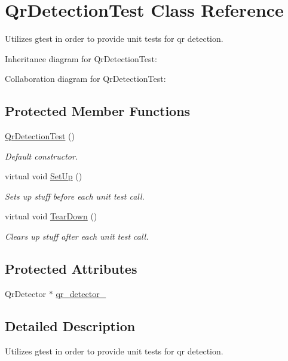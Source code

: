 \hypertarget{classQrDetectionTest}{\section{Qr\-Detection\-Test Class Reference}
\label{classQrDetectionTest}
}


Utilizes gtest in order to provide unit tests for qr detection.  




Inheritance diagram for Qr\-Detection\-Test\-:


Collaboration diagram for Qr\-Detection\-Test\-:
\subsection*{Protected Member Functions}
\begin{DoxyCompactItemize}
\item 
\hyperlink{classQrDetectionTest_a355fddb07a4da10daacfc44b0f18ed7e}{Qr\-Detection\-Test} ()
\begin{DoxyCompactList}\small\item\em Default constructor. \end{DoxyCompactList}\item 
virtual void \hyperlink{classQrDetectionTest_aaa2db67a98ba4e75ddf81d5d2c2d07ff}{Set\-Up} ()
\begin{DoxyCompactList}\small\item\em Sets up stuff before each unit test call. \end{DoxyCompactList}\item 
virtual void \hyperlink{classQrDetectionTest_a3ca1c254bc4c0466f16a5783711acfda}{Tear\-Down} ()
\begin{DoxyCompactList}\small\item\em Clears up stuff after each unit test call. \end{DoxyCompactList}\end{DoxyCompactItemize}
\subsection*{Protected Attributes}
\begin{DoxyCompactItemize}
\item 
Qr\-Detector $\ast$ \hyperlink{classQrDetectionTest_ac62a7bc15bd994065114bea3f5e7680c}{qr\-\_\-detector\-\_\-}
\end{DoxyCompactItemize}


\subsection{Detailed Description}
Utilizes gtest in order to provide unit tests for qr detection. 

